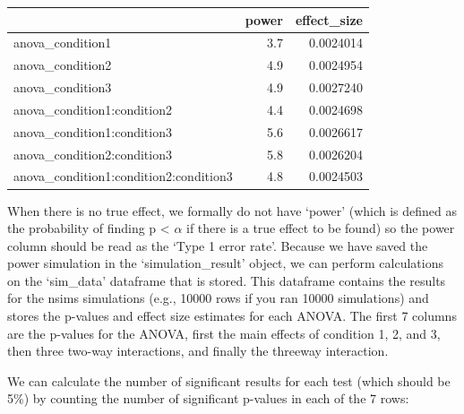 \documentclass[]{book}
\newenvironment{Shaded}{\begin{snugshade}}{\end{snugshade}}
\newcommand{\ControlFlowTok}[1]{\textcolor[rgb]{0.13,0.29,0.53}{\textbf{#1}}}
\newcommand{\DecValTok}[1]{\textcolor[rgb]{0.00,0.00,0.81}{#1}}
\newcommand{\KeywordTok}[1]{\textcolor[rgb]{0.13,0.29,0.53}{\textbf{#1}}}
\newcommand{\NormalTok}[1]{#1}
\newcommand{\OperatorTok}[1]{\textcolor[rgb]{0.81,0.36,0.00}{\textbf{#1}}}
\newcommand{\StringTok}[1]{\textcolor[rgb]{0.31,0.60,0.02}{#1}}
\begin{document}
\begin{tabular}{l|r|r}
\hline
  & power & effect\_size\\
\hline
anova\_condition1 & 3.7 & 0.0024014\\
\hline
anova\_condition2 & 4.9 & 0.0024954\\
\hline
anova\_condition3 & 4.9 & 0.0027240\\
\hline
anova\_condition1:condition2 & 4.4 & 0.0024698\\
\hline
anova\_condition1:condition3 & 5.6 & 0.0026617\\
\hline
anova\_condition2:condition3 & 5.8 & 0.0026204\\
\hline
anova\_condition1:condition2:condition3 & 4.8 & 0.0024503\\
\hline
\end{tabular}

When there is no true effect, we formally do not have `power' (which is defined as the probability of finding p \textless{} \(\alpha\) if there is a true effect to be found) so the power column should be read as the `Type 1 error rate'. Because we have saved the power simulation in the `simulation\_result' object, we can perform calculations on the `sim\_data' dataframe that is stored. This dataframe contains the results for the nsims simulations (e.g., 10000 rows if you ran 10000 simulations) and stores the p-values and effect size estimates for each ANOVA. The first 7 columns are the p-values for the ANOVA, first the main effects of condition 1, 2, and 3, then three two-way interactions, and finally the threeway interaction.

We can calculate the number of significant results for each test (which should be 5\%) by counting the number of significant p-values in each of the 7 rows:

\begin{Shaded}
\end{Shaded}
\end{document}
